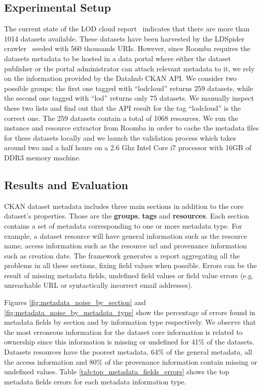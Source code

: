 \documentclass[runningheads,a4paper]{../../Tools/LaTEX/llncs}
\begin{document}
\subsection{Experimental Setup}
The current state of the LOD cloud report~\cite{Schmachtenberg:ISWC:14} indicates that there are more than 1014 datasets available. These datasets have been harvested by the LDSpider crawler~\cite{Isele:ISWC:10} seeded with 560 thousands URIs. However, since Roomba requires the datasets metadata to be hosted in a data portal where either the dataset publisher or the portal administrator can attach relevant metadata to it, we rely on the information provided by the Datahub CKAN API. We consider two possible groups: the first one tagged with ``lodcloud'' returns 259 datasets, while the second one tagged with ``lod'' returns only 75 datasets. We manually inspect these two lists and find out that the API result for the tag ``lodcloud'' is the correct one. The 259 datasets contain a total of 1068 resources. We run the instance and resource extractor from Roomba in order to cache the metadata files for these datasets locally and we launch the validation process which takes around two and a half hours on a 2.6 Ghz Intel Core i7 processor with 16GB of DDR3 memory machine.

\subsection{Results and Evaluation}
CKAN dataset metadata includes three main sections in addition to the core dataset's properties. Those are the \textbf{groups}, \textbf{tags} and \textbf{resources}. Each section contains a set of metadata corresponding to one or more metadata type. For example, a dataset resource will have general information such as the resource name, access information such as the resource url and provenance information such as creation date. The framework generates a report aggregating all the problems in all these sections, fixing field values when possible. Errors can be the result of missing metadata fields, undefined field values or field value errors (e.g. unreachable URL or syntactically incorrect email addresses).

Figures \ref{fig:metadata_noise_by_section} and \ref{fig:metadata_noise_by_metadata_type} show the percentage of errors found in metadata fields by section and by information type respectively. We observe that the most erroneous information for the dataset core information is related to ownership since this information is missing or undefined for 41\% of the datasets. Datasets resources have the poorest metadata. 64\% of the general metadata, all the access information and 80\% of the provenance information contain missing or undefined values. Table \ref{tab:top_metadata_fields_errors} shows the top metadata fields errors for each metadata information type.
\end{document}
